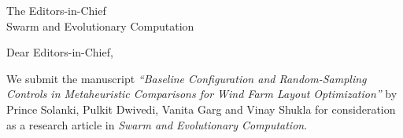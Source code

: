 \documentclass[11pt]{letter}
\date{\TBD{date of submission}}
\newcommand{\Journal}{Swarm and Evolutionary Computation}
\newcommand{\JournalEditor}{The Editors-in-Chief}
\begin{document}
\pagestyle{empty}
\begin{letter}{\JournalEditor\\\Journal}
\vspace{-3.2em}
\opening{Dear Editors-in-Chief,}

We submit the manuscript \textit{``Baseline Configuration and Random-Sampling Controls in Metaheuristic Comparisons for Wind Farm Layout Optimization''} by Prince Solanki, Pulkit Dwivedi, Vanita Garg and Vinay Shukla for consideration as a research article in \textit{\Journal}.


\end{letter}
\end{document}

